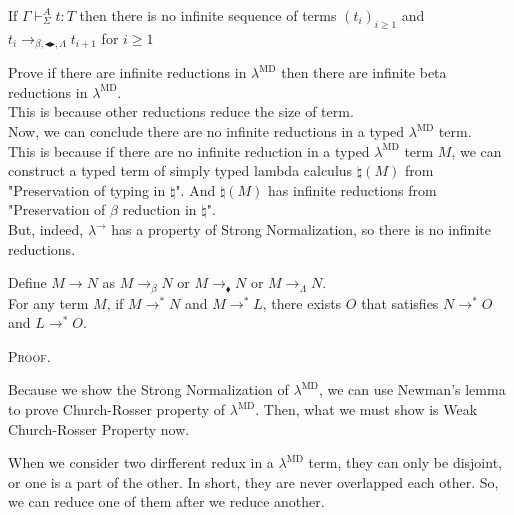 \documentclass[9pt, a4paper]{extarticle}
\theoremstyle{break}
\newcommand{\G}{\Gamma}
\newcommand{\V}{\vdash_\Sigma}
\newcommand{\TB}{\blacktriangleright}
\newcommand{\TBL}{\blacktriangleleft}
\begin{document}
\begin{thm}
	If $\G\V^A t:T$ then there is no infinite sequence of terms $(t_i)_{i\ge1}$ and $t_i \longrightarrow_{\beta, \TBL \TB,\Lambda} t_{i+1}$ for $i\ge 1$
\end{thm}

Prove if there are infinite reductions in $\lambda^{\text{MD}}$ then there are infinite beta reductions in $\lambda^{\text{MD}}$.\\
This is because other reductions reduce the size of term.\\

Now, we can conclude there are no infinite reductions in a typed $\lambda^{\text{MD}}$ term. \\

This is because if there are no infinite reduction in a typed $\lambda^{\text{MD}}$ term $M$,
we can construct a typed term of simply typed lambda calculus $\natural(M)$ from "Preservation of typing in $\natural$".
And $\natural(M)$ has infinite reductions from "Preservation of $\beta$ reduction in $\natural$".\\

But, indeed, $\lambda^\to$ has a property of Strong Normalization, so there is no infinite reductions.

\begin{thm}
	Define $M \longrightarrow N$ as $M \longrightarrow_{\beta} N$ or $M\longrightarrow_\blacklozenge N$ or  $M \longrightarrow_{\Lambda} N$.\\
	For any term $M$, if $M \longrightarrow^* N$ and $M \longrightarrow^* L$,
	there exists $O$ that satisfies $N \longrightarrow^* O$ and $L \longrightarrow^* O$.
\end{thm}

\textsc{Proof.}

Because we show the Strong Normalization of $\lambda^{\text{MD}}$, we can use Newman's lemma to prove Church-Rosser property of $\lambda^{\text{MD}}$.
Then, what we must show is Weak Church-Rosser Property now.

When we consider two dirfferent redux in a $\lambda^{\text{MD}}$ term, they can only be disjoint, or one is a part of the other.
In short, they are never overlapped each other.
So, we can reduce one of them after we reduce another.\\
\end{document}
